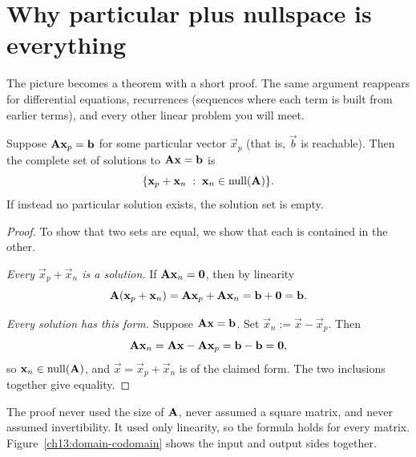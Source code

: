 \section{Why particular plus nullspace is everything}

The picture becomes a theorem with a short proof. The same argument reappears for
differential equations, recurrences (sequences where each term is built from earlier
terms), and every other linear problem you will meet.

\begin{theorem}
\label{ch13:structure}
Suppose $\mathbf{A}\mathbf{x}_p=\mathbf{b}$ for some particular vector $\vec{x}_p$ (that is,
$\vec{b}$ is reachable). Then the complete set of solutions to $\mathbf{A}\mathbf{x}=\mathbf{b}$ is
\[
  \{\mathbf{x}_p+\mathbf{x}_n \;:\; \mathbf{x}_n\in\operatorname{null}(\mathbf{A})\}.
\]
If instead no particular solution exists, the solution set is empty.
\end{theorem}

\begin{proof}
To show that two sets are equal, we show that each is contained in the other.

\emph{Every $\vec{x}_p+\vec{x}_n$ is a solution.} If $\mathbf{A}\mathbf{x}_n=\mathbf{0}$, then by
linearity
\[
  \mathbf{A}(\mathbf{x}_p+\mathbf{x}_n)=\mathbf{A}\mathbf{x}_p+\mathbf{A}\mathbf{x}_n=\mathbf{b}+\mathbf{0}=\mathbf{b}.
\]

\emph{Every solution has this form.} Suppose $\mathbf{A}\mathbf{x}=\mathbf{b}$. Set
$\vec{x}_n:=\vec{x}-\vec{x}_p$. Then
\[
  \mathbf{A}\mathbf{x}_n=\mathbf{A}\mathbf{x}-\mathbf{A}\mathbf{x}_p=\mathbf{b}-\mathbf{b}=\mathbf{0},
\]
so $\mathbf{x}_n\in\operatorname{null}(\mathbf{A})$, and $\vec{x}=\vec{x}_p+\vec{x}_n$ is of the claimed
form. The two inclusions together give equality.
\end{proof}

The proof never used the size of $\mathbf{A}$, never assumed a square matrix, and never
assumed invertibility. It used only linearity, so the formula holds for every matrix.
Figure~\ref{ch13:domain-codomain} shows the input and output sides together.

